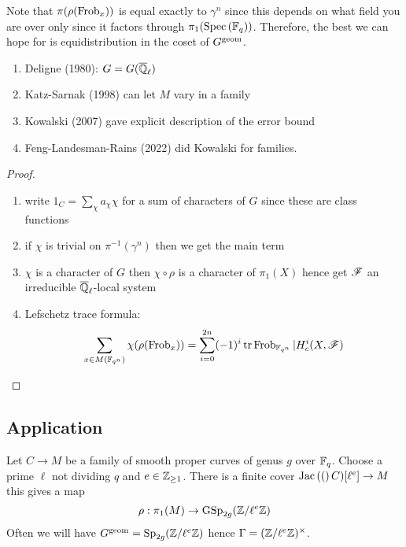\documentclass[12pt]{article}
\begin{document}
\begin{rmk}
Note that $\pi(\rho(\operatorname{\mathrm{Frob}}_x))$ is equal exactly to $\gamma^n$ since this depends on what field you are over only since it factors through $\pi_1(\mathrm{Spec}\left( \mathbb{F}_q \right))$. Therefore, the best we can hope for is equidistribution in the coset of $G^{\mathrm{geom}}$.
\end{rmk}

\begin{rmk}
\begin{enumerate}
\item Deligne (1980): $G = G(\overline{\mathbb{Q}}_\ell)$
\item Katz-Sarnak (1998) can let $M$ vary in a family
\item Kowalski (2007) gave explicit description of the error bound
\item Feng-Landesman-Rains (2022) did Kowalski for families.
\end{enumerate}
\end{rmk}

\begin{proof}
\begin{enumerate}
\item write $1_C = \sum_{\chi} a_{\chi} \chi$ for a sum of characters of $G$ since these are class functions
\item if $\chi$ is trivial on $\pi^{-1}(\gamma^n)$ then we get the main term
\item $\chi$ is a character of $G$ then $\chi \circ \rho$ is a character of $\pi_1(X)$ hence get $\mathscr{F}$ an irreducible $\overline{\mathbb{Q}}_{\ell}$-local system
\item Lefschetz trace formula:
\[ \sum_{x \in M(\mathbb{F}_{q^n})} \chi(\rho(\operatorname{\mathrm{Frob}}_x)) = \sum_{i = 0}^{2n} (-1)^i \operatorname{\mathrm{tr}}{\operatorname{\mathrm{Frob}}_{\mathbb{F}_{q^n}} | H^i_c(X, \mathscr{F})} \]
\end{enumerate}
\end{proof}

\subsection{Application}

Let $C \to M$ be a family of smooth proper curves of genus $g$ over $\mathbb{F}_q$. Choose a prime $\ell$ not dividing $q$ and $e \in \mathbb{Z}_{\ge 1}$. There is a finite \etale cover $\mathrm{Jac}\left( ( \right)C)[\ell^e] \to M$ this gives a map
\[ \rho : \pi_1(M) \to \mathrm{GSp}_{2g}(\mathbb{Z} / \ell^e \mathbb{Z}) \]
Often we will have $G^{\mathrm{geom}} = \mathrm{Sp}_{2g}(\mathbb{Z} / \ell^e \mathbb{Z})$ hence $\Gamma = (\mathbb{Z} / \ell^e \mathbb{Z})^\times$. 
\end{document}
